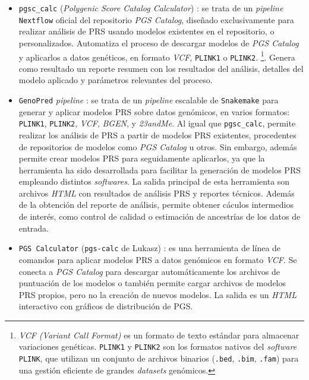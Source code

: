 \begin{itemize}
   \item
    \texttt{pgsc\_calc} (\textit{Polygenic Score Catalog Calculator}) \cite{lambert2024}: se trata de un \textit{pipeline} \texttt{Nextflow} oficial del repositorio \textit{PGS Catalog}, diseñado exclusivamente para realizar análisis de PRS usando modelos existentes en el repositorio, o personalizados. Automatiza el proceso de descargar modelos de \textit{PGS Catalog} y aplicarlos a datos genéticos, en formato \textit{VCF}, \texttt{PLINK1} o \texttt{PLINK2}. \footnote{\textit{VCF (Variant Call Format)} es un formato de texto estándar para almacenar variaciones genéticas. \texttt{PLINK1} y \texttt{PLINK2} son los formatos nativos del \textit{software} \texttt{PLINK}, que utilizan un conjunto de archivos binarios (\texttt{.bed}, \texttt{.bim}, \texttt{.fam}) para una gestión eficiente de grandes \textit{datasets} genómicos.}. Genera como resultado un reporte resumen con los resultados del análisis, detalles del modelo aplicado y parámetros relevantes del proceso. 
    
    \item
    \texttt{GenoPred} \textit{pipeline} \cite{pain2024}: se trata de un \textit{pipeline} escalable de \texttt{Snakemake} para generar y aplicar modelos PRS sobre datos genómicos, en varios formatos: \texttt{PLINK1}, \texttt{PLINK2}, \textit{VCF}, \textit{BGEN}, y \textit{23andMe}. Al igual que \texttt{pgsc\_calc}, permite realizar los análisis de PRS a partir de modelos PRS existentes, procedentes de repositorios de modelos como \textit{PGS Catalog} u otros. Sin embargo, además permite crear modelos PRS para seguidamente aplicarlos, ya que la herramienta ha sido desarrollada para facilitar la generación de modelos PRS empleando distintos \textit{softwares}. La salida principal de esta herramienta son archivos \textit{HTML} con resultados de análisis PRS y reportes técnicos. Además de la obtención del reporte de análisis, permite obtener cáculos intermedios de interés, como control de calidad o estimación de ancestrías de los datos de entrada.
     
    \item
     \texttt{PGS Calculator} (\texttt{pgs-calc} de Lukasz) \cite{lukfor_pgscalc}: es una herramienta de línea de comandos para aplicar modelos PRS a datos genómicos en formato \textit{VCF}. Se conecta a \textit{PGS Catalog} para descargar automáticamente los archivos de puntuación de los modelos o también permite cargar archivos de modelos PRS propios, pero no la creación de nuevos modelos. La salida es un \textit{HTML} interactivo con gráficos de distribución de PGS. 


\end{itemize}
